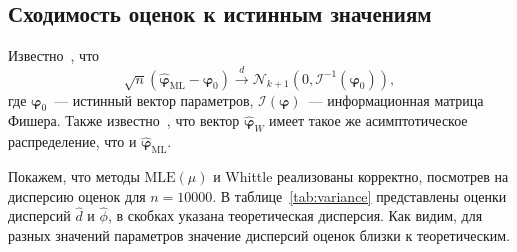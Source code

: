 \documentclass[specialist,
substylefile = spbu_report.rtx,
subf,href,colorlinks=true, 12pt]{disser}
\theoremstyle{definition}
\begin{document}

\subsection{Сходимость оценок к истинным значениям}
Известно~\cite[Theorem 8.1]{Hassler2018}, что
\begin{equation}\label{eq:mle_distribution}
	\sqrt{n}(\widehat{\bm\varphi}_\mathrm{ML} - \bm\varphi_0)\overset{d}{\longrightarrow} \mathcal{N}_{k+1}(0, \mathcal{I}^{-1}(\bm{\varphi}_0)),
\end{equation}
где $\bm\varphi_0$~--- истинный вектор параметров, $\mathcal{I}(\bm\varphi)$~--- информационная матрица Фишера. Также известно~\cite[Proposition 8.3]{Hassler2018}, что вектор $\widehat{\bm\varphi}_W$ имеет такое же асимптотическое распределение, что и $\widehat{\bm\varphi}_\mathrm{ML}$.

Покажем, что методы $\mathrm{MLE}(\mu)$ и Whittle реализованы корректно, посмотрев на дисперсию оценок для $n=10000$. В таблице~\ref{tab:variance} представлены оценки дисперсий $\hat d$ и $\hat \phi$, в скобках указана теоретическая дисперсия. Как видим, для разных значений параметров значение дисперсий оценок близки к теоретическим.
\end{document}
